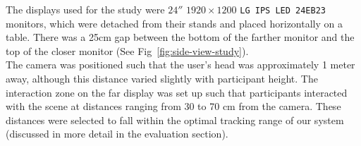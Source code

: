 \begin{invisBox}
	\hfill
\end{invisBox}

The displays used for the study were $24''$ $1920 \times 1200$ \texttt{LG IPS LED 24EB23} monitors, which were detached from their stands and placed horizontally on a table. There was a 25cm gap between the bottom of the farther monitor and the top of the closer monitor (See Fig~\ref{fig:side-view-study}). \\

The camera was positioned such that the user’s head was approximately 1 meter away, although this distance varied slightly with participant height. The interaction zone on the far display was set up such that participants interacted with the scene at distances ranging from 30 to 70 cm from the camera. These distances were selected to fall within the optimal tracking range of our system (discussed in more detail in the evaluation section). \\

